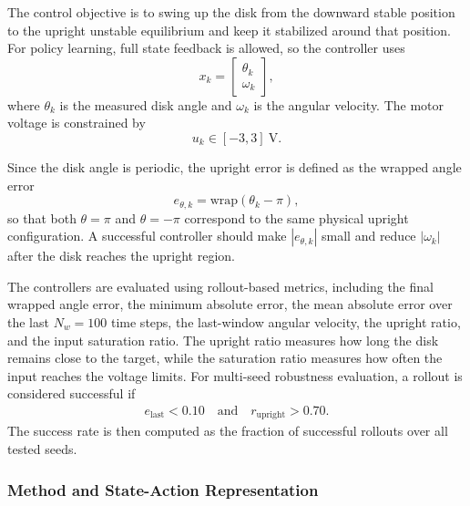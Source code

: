 The control objective is to swing up the disk from the downward stable position
to the upright unstable equilibrium and keep it stabilized around that position.
For policy learning, full state feedback is allowed, so the controller uses
\begin{equation}
    x_k =
    \begin{bmatrix}
        \theta_k \\
        \omega_k
    \end{bmatrix},
\label{eq:policy_full_state}
\end{equation}
where $\theta_k$ is the measured disk angle and $\omega_k$ is the angular
velocity. The motor voltage is constrained by
\begin{equation}
    u_k \in [-3,3]~\mathrm{V}.
\label{eq:policy_input_constraint}
\end{equation}

Since the disk angle is periodic, the upright error is defined as the wrapped
angle error
\begin{equation}
    e_{\theta,k} = \mathrm{wrap}(\theta_k-\pi),
\label{eq:policy_wrapped_error}
\end{equation}
so that both $\theta=\pi$ and $\theta=-\pi$ correspond to the same physical
upright configuration. A successful controller should make
$|e_{\theta,k}|$ small and reduce $|\omega_k|$ after the disk reaches the
upright region.

The controllers are evaluated using rollout-based metrics, including the final
wrapped angle error, the minimum absolute error, the mean absolute error over
the last $N_w=100$ time steps, the last-window angular velocity, the upright
ratio, and the input saturation ratio. The upright ratio measures how long the
disk remains close to the target, while the saturation ratio measures how often
the input reaches the voltage limits. For multi-seed robustness evaluation, a
rollout is considered successful if
\begin{equation}
\begin{aligned}
    e_{\mathrm{last}} < 0.10
    \quad \mathrm{and} \quad
    r_{\mathrm{upright}} > 0.70.
\end{aligned}
\label{eq:policy_success_condition}
\end{equation}
The success rate is then computed as the fraction of successful rollouts over
all tested seeds.



\subsubsection{Method and State-Action Representation}

